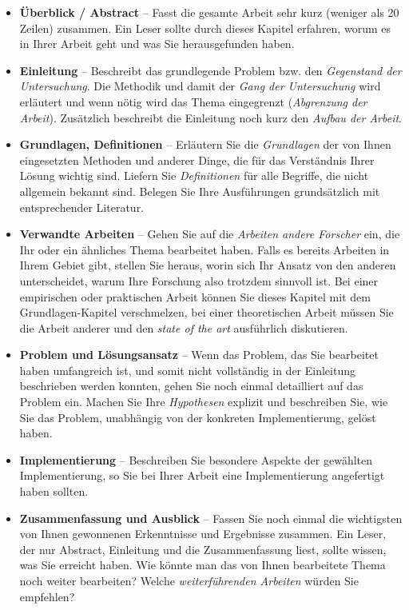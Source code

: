 \documentclass[a4paper,11pt,headings=normal]{scrartcl}
\begin{document}
\begin{itemize}
\item \textbf{Überblick / Abstract} -- Fasst die gesamte Arbeit sehr kurz (weniger als 20 Zeilen) zusammen. Ein Leser sollte durch dieses Kapitel erfahren, worum es in Ihrer Arbeit geht und was Sie herausgefunden haben.

\item \textbf{Einleitung} -- Beschreibt das grundlegende Problem bzw. den \textit{Gegenstand der Untersuchung}. Die Methodik und damit der \textit{Gang der Untersuchung} wird erläutert und wenn nötig wird das Thema eingegrenzt (\textit{Abgrenzung der Arbeit}). Zusätzlich beschreibt die Einleitung noch kurz den \textit{Aufbau der Arbeit}. 

\item \textbf{Grundlagen, Definitionen} -- Erläutern Sie die \textit{Grundlagen} der von Ihnen eingesetzten Methoden und anderer Dinge, die für das Verständnis Ihrer Lösung wichtig sind. Liefern Sie \textit{Definitionen} für alle Begriffe, die nicht allgemein bekannt sind. Belegen Sie Ihre Ausführungen grundsätzlich mit entsprechender Literatur.

\item \textbf{Verwandte Arbeiten} -- Gehen Sie auf die \textit{Arbeiten andere Forscher} ein, die Ihr oder ein ähnliches Thema bearbeitet haben. Falls es bereits Arbeiten in Ihrem Gebiet gibt, stellen Sie heraus, worin sich Ihr Ansatz von den anderen unterscheidet, warum Ihre Forschung also trotzdem sinnvoll ist. Bei einer empirischen oder praktischen Arbeit können Sie dieses Kapitel mit dem Grundlagen-Kapitel verschmelzen, bei einer theoretischen Arbeit müssen Sie die Arbeit anderer und den \textit{state of the art} ausführlich diskutieren.

\item \textbf{Problem und Lösungsansatz} -- Wenn das Problem, das Sie bearbeitet haben umfangreich ist, und somit nicht vollständig in der Einleitung beschrieben werden konnten, gehen Sie noch einmal detailliert auf das Problem ein. Machen Sie Ihre \textit{Hypothesen} explizit und beschreiben Sie, wie Sie das Problem, unabhängig von der konkreten Implementierung, gelöst haben. 

\item \textbf{Implementierung} -- Beschreiben Sie besondere Aspekte der gewählten Implementierung, so Sie bei Ihrer Arbeit eine Implementierung angefertigt haben sollten.

\item \textbf{Zusammenfassung und Ausblick} -- Fassen Sie noch einmal die wichtigsten von Ihnen gewonnenen Erkenntnisse und Ergebnisse zusammen. Ein Leser, der nur Abstract, Einleitung und die Zusammenfassung liest, sollte wissen, was Sie erreicht haben. Wie könnte man das von Ihnen bearbeitete Thema noch weiter bearbeiten? Welche \textit{weiterführenden Arbeiten} würden Sie empfehlen?
\end{itemize}
\end{document}
